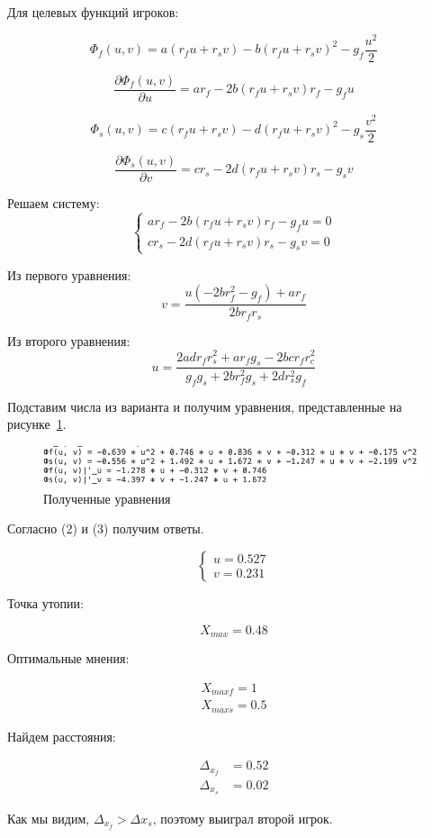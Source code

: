 Для целевых функций игроков:

\[
\Phi_f(u,v) = a(r_fu + r_sv) - b(r_fu + r_sv)^2 - g_f \frac{u^2}{2}
\]

\[
\frac{\partial \Phi_f(u,v)}{\partial u} = a r_f - 2b(r_fu + r_sv)r_f - g_f u
\]

\[
\Phi_s(u,v) = c(r_fu + r_sv) - d(r_fu + r_sv)^2 - g_s \frac{v^2}{2}
\]

\[
\frac{\partial \Phi_s(u,v)}{\partial v} = c r_s - 2d(r_fu + r_sv)r_s - g_s v
\]

Решаем систему:
\[
\begin{cases}
a r_f - 2b(r_fu + r_sv)r_f - g_f u = 0 \\
c r_s - 2d(r_fu + r_sv)r_s - g_s v = 0
\end{cases}
\]

Из первого уравнения:
\begin{equation}
v = \frac{u(-2b r_f^2 - g_f) + a r_f}{2b r_f r_s}
\end{equation}

Из второго уравнения:
\begin{equation}
u = \frac{2 a d r_f r_s^2 + a r_f g_s - 2 b c r_f r_c^2}{g_f g_s + 2 b r_f^2 g_s + 2 d r_s^2 g_f}
\end{equation}

Подставим числа из варианта и получим уравнения, представленные на рисунке~\ref{fig:fig11}.

\begin{figure}
  \centering
  \includegraphics[scale=0.6]{../../artifacts/rk3/11.png}
  \caption{Полученные уравнения}
  \label{fig:fig11}
\end{figure}

Согласно (2) и (3) получим ответы.

\[
  \begin{cases}
  u = 0.527 \\
  v = 0.231
  \end{cases}
\]

Точка утопии:

\[
  X_{max} = 0.48
\]

Оптимальные мнения:

\begin{align*}
  X_{max f} = 1 \\
  X_{max s} = 0.5
\end{align*}

Найдем расстояния:

\begin{align*}
  \Delta_{x_f} &= 0.52 \\
  \Delta_{x_s} &= 0.02
\end{align*}

Как мы видим, $\Delta_{x_f} > \Delta{x_s}$, поэтому выиграл второй игрок.
